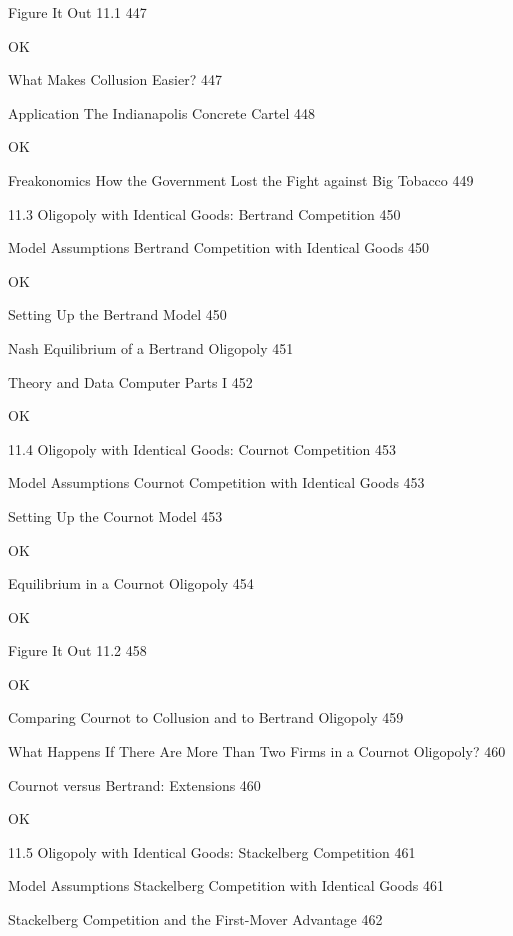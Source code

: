 Figure It Out 11.1 447

OK

What Makes Collusion Easier? 447



Application The Indianapolis Concrete Cartel 448

OK

Freakonomics How the Government Lost the Fight against Big Tobacco 449



11.3 Oligopoly with Identical Goods: Bertrand Competition 450



Model Assumptions Bertrand Competition with Identical Goods 450

OK

Setting Up the Bertrand Model 450



Nash Equilibrium of a Bertrand Oligopoly 451



Theory and Data Computer Parts I 452

OK

11.4 Oligopoly with Identical Goods: Cournot Competition 453



Model Assumptions Cournot Competition with Identical Goods 453



Setting Up the Cournot Model 453

OK

Equilibrium in a Cournot Oligopoly 454

OK

Figure It Out 11.2 458

OK

Comparing Cournot to Collusion and to Bertrand Oligopoly 459



What Happens If There Are More Than Two Firms in a Cournot Oligopoly? 460



Cournot versus Bertrand: Extensions 460

OK

11.5 Oligopoly with Identical Goods: Stackelberg Competition 461



Model Assumptions Stackelberg Competition with Identical Goods 461



Stackelberg Competition and the First-Mover Advantage 462

